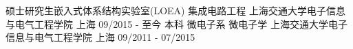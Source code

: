 

\begin{cventries}

  \cventry
    {\hspace{0.75cm}硕士研究生\hspace{0.25cm}嵌入式体系结构实验室(LOEA)\hspace{0.25cm} 集成电路工程} %
    {上海交通大学\hspace{0.1cm}电子信息与电气工程学院} %
    {上海} %
    {09/2015 - 至今} %
    {
    }
    \cventry
    {\hspace{0.7cm}本科	\hspace{0.25cm}	微电子系\hspace{0.25cm} 微电子学} %
    {上海交通大学\hspace{0.1cm}电子信息与电气工程学院} %
    {上海} %
    {09/2011 - 07/2015} %
    {
    }


\end{cventries}
